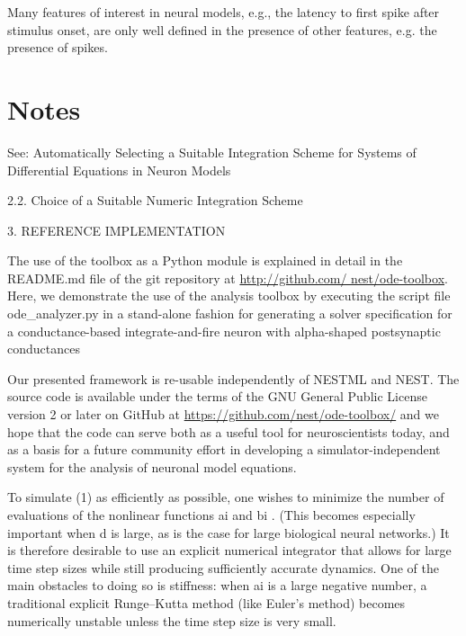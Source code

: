 Many features of interest in neural models, e.g., the latency to first spike after stimulus onset, are only well defined in the presence of other features, e.g. the presence of spikes. 


\section{Notes}


See: Automatically Selecting a Suitable Integration Scheme for Systems of Differential Equations in Neuron Models

2.2. Choice of a Suitable Numeric Integration Scheme

3. REFERENCE IMPLEMENTATION

The use of the toolbox as a Python module is explained in detail in the README.md file of the git repository at \url{http://github.com/ nest/ode-toolbox}. Here, we demonstrate the use of the analysis toolbox by executing the script file ode\_analyzer.py in a stand-alone fashion for generating a solver specification for a conductance-based integrate-and-fire neuron with alpha-shaped postsynaptic conductances


Our presented framework is re-usable independently of NESTML and NEST. The source code is available under the terms of the GNU General Public License version 2 or later on GitHub at \url{https://github.com/nest/ode-toolbox/} and we hope that the code can serve both as a useful tool for neuroscientists today, and as a basis for a future community effort in developing a simulator-independent system for the analysis of neuronal model equations.


To simulate (1) as efficiently as possible, one wishes to minimize the number of evaluations
of the nonlinear functions ai and bi
. (This becomes especially important when d is large,
as is the case for large biological neural networks.) It is therefore desirable to use an
explicit numerical integrator that allows for large time step sizes while still producing
sufficiently accurate dynamics. One of the main obstacles to doing so is stiffness: when ai
is
a large negative number, a traditional explicit Runge–Kutta method (like Euler’s method)
becomes numerically unstable unless the time step size is very small. 


